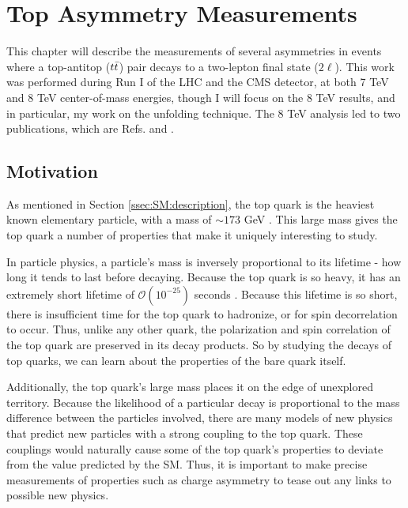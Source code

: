 \chapter{Top Asymmetry Measurements}
\label{chap:afb}

This chapter will describe the measurements of several asymmetries in
events where a top-antitop ($t\bar{t}$) pair decays to a two-lepton
final state ($2\ell$). This work was performed during Run I of the LHC and the
CMS detector, at both 7 TeV and 8 TeV center-of-mass energies, though
I will focus on the 8 TeV results, and in particular, my work on the
unfolding technique. The 8 TeV analysis led to two publications, which
are Refs. \cite{chargeasym} and \cite{spincorrpol}.


\section{Motivation}
\label{sec:afb:motivation}

As mentioned in Section \ref{ssec:SM:description}, the top quark is the
heaviest known elementary particle, with a mass of $\sim 173$ GeV
\cite{pdg}. This large mass gives the top quark a number of properties
that make it uniquely interesting to study.

In particle physics, a particle's mass is inversely proportional to
its lifetime - how long it tends to last before decaying. %
Because the top quark is so heavy, it has an extremely short lifetime
of $\mathcal{O} (10^{-25})$ seconds \cite{pdg}.
Because this lifetime is so short, there is insufficient time for the
top quark to hadronize, or for spin decorrelation to occur. %
Thus, unlike any other quark, the polarization and spin correlation
of the top quark are preserved in its decay products. So by studying
the decays of top quarks, we can learn about the properties of the
bare quark itself.

Additionally, the top quark's large mass places it on the edge of
unexplored territory.
Because the likelihood of a particular decay is proportional
to the mass difference between the particles involved, there are many
models of new physics that predict new particles with a strong
coupling to the top quark. %
These couplings would naturally cause some of the top quark's
properties to deviate from the value predicted by the SM. Thus, it is
important to make precise measurements of properties such as charge
asymmetry to tease out any links to possible new physics.


